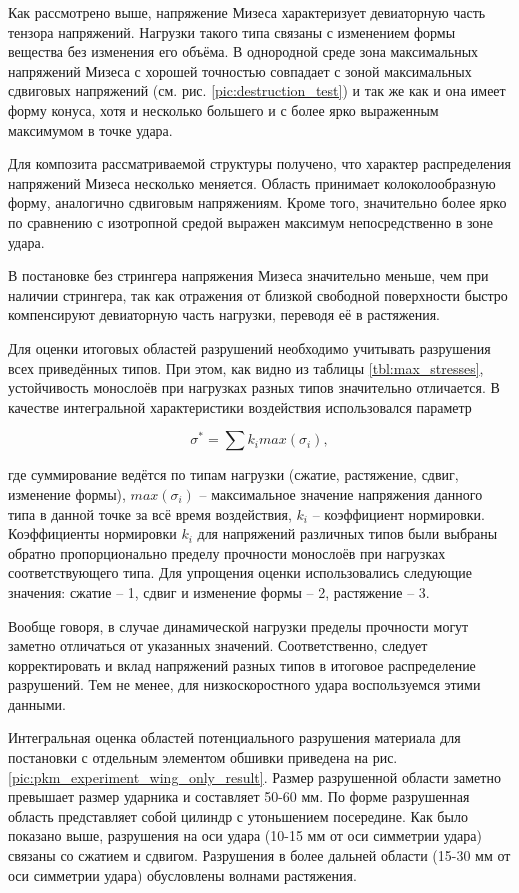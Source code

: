 Как рассмотрено выше, напряжение Мизеса характеризует девиаторную часть тензора напряжений. Нагрузки такого типа связаны с изменением формы вещества без изменения его объёма. В однородной среде зона максимальных напряжений Мизеса с хорошей точностью совпадает с зоной максимальных сдвиговых напряжений (см. рис. \ref{pic:destruction_test}) и так же как и она имеет форму конуса, хотя и несколько большего и с более ярко выраженным максимумом в точке удара.

Для композита рассматриваемой структуры получено, что характер распределения напряжений Мизеса несколько меняется. Область принимает колоколообразную форму, аналогично сдвиговым напряжениям. Кроме того, значительно более ярко по сравнению с изотропной средой выражен максимум непосредственно в зоне удара.

В постановке без стрингера напряжения Мизеса значительно меньше, чем при наличии стрингера, так как отражения от близкой свободной поверхности быстро компенсируют девиаторную часть нагрузки, переводя её в растяжения.


\clearpage
\newpage


Для оценки итоговых областей разрушений необходимо учитывать разрушения всех приведённых типов. При этом, как видно из таблицы \ref{tbl:max_stresses}, устойчивость монослоёв при нагрузках разных типов значительно отличается. В качестве интегральной характеристики воздействия использовался параметр

\begin{equation}
\sigma^* = \sum{k_i max(\sigma_i)},
\end{equation}

где суммирование ведётся по типам нагрузки (сжатие, растяжение, сдвиг, изменение формы), $max(\sigma_i)$ -- максимальное значение напряжения данного типа в данной точке за всё время воздействия, $k_i$ -- коэффициент нормировки. Коэффициенты нормировки $k_i$ для напряжений различных типов были выбраны обратно пропорционально пределу прочности монослоёв при нагрузках соответствующего типа. Для упрощения оценки использовались следующие значения: сжатие -- 1, сдвиг и изменение формы -- 2, растяжение -- 3.

Вообще говоря, в случае динамической нагрузки пределы прочности могут заметно отличаться от указанных значений. Соответственно, следует корректировать и вклад напряжений разных типов в итоговое распределение разрушений. Тем не менее, для низкоскоростного удара воспользуемся этими данными.

Интегральная оценка областей потенциального разрушения материала для постановки с отдельным элементом обшивки приведена на рис. \ref{pic:pkm_experiment_wing_only_result}. Размер разрушенной области заметно превышает размер ударника и составляет 50-60 мм. По форме разрушенная область представляет собой цилиндр с утоньшением посередине. Как было показано выше, разрушения на оси удара (10-15 мм от оси симметрии удара) связаны со сжатием и сдвигом. Разрушения в более дальней области (15-30 мм от оси симметрии удара) обусловлены волнами растяжения.


